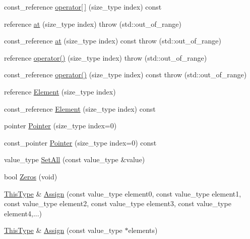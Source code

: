 \begin{DoxyCompactItemize}
\item 
const\+\_\+reference \hyperlink{classvct_fixed_size_vector_base_aab4c42f30b4481af7073b7993038389a}{operator\mbox{[}$\,$\mbox{]}} (size\+\_\+type index) const 
\item 
reference \hyperlink{classvct_fixed_size_vector_base_a787ffed04af0ebdde525c08e2da704da}{at} (size\+\_\+type index)  throw (std\+::out\+\_\+of\+\_\+range)
\item 
const\+\_\+reference \hyperlink{classvct_fixed_size_vector_base_a0425241e2ca18a9e3554cf9d58737cc3}{at} (size\+\_\+type index) const   throw (std\+::out\+\_\+of\+\_\+range)
\item 
reference \hyperlink{classvct_fixed_size_vector_base_a768864b05bd40054ca17a3ed0027ea54}{operator()} (size\+\_\+type index)  throw (std\+::out\+\_\+of\+\_\+range)
\item 
const\+\_\+reference \hyperlink{classvct_fixed_size_vector_base_a3d3ccc563d1d76820801178d2907f151}{operator()} (size\+\_\+type index) const   throw (std\+::out\+\_\+of\+\_\+range)
\item 
reference \hyperlink{classvct_fixed_size_vector_base_a571a7569f74a7dc6c25dc29794cfbe23}{Element} (size\+\_\+type index)
\item 
const\+\_\+reference \hyperlink{classvct_fixed_size_vector_base_a0b851f0bbe19cf157082e8abb819a558}{Element} (size\+\_\+type index) const 
\item 
pointer \hyperlink{classvct_fixed_size_vector_base_aa71ce242a6bb5be99f1ee03734a0ea79}{Pointer} (size\+\_\+type index=0)
\item 
const\+\_\+pointer \hyperlink{classvct_fixed_size_vector_base_aff11b9ec1fc5c53e04d3cb4c416c3b66}{Pointer} (size\+\_\+type index=0) const 
\item 
value\+\_\+type \hyperlink{classvct_fixed_size_vector_base_ae0659dd664fd0be5b5c4ff9c2d13c64e}{Set\+All} (const value\+\_\+type \&value)
\item 
bool \hyperlink{classvct_fixed_size_vector_base_ae05c0457787820f7bc312da5444a14d9}{Zeros} (void)
\item 
\hyperlink{classvct_fixed_size_const_vector_base_a071063bc4fa43112cc287b2dbef53180}{This\+Type} \& \hyperlink{classvct_fixed_size_vector_base_ac22e9269ac2c76822cf4889053063f66}{Assign} (const value\+\_\+type element0, const value\+\_\+type element1, const value\+\_\+type element2, const value\+\_\+type element3, const value\+\_\+type element4,...)
\item 
\hyperlink{classvct_fixed_size_const_vector_base_a071063bc4fa43112cc287b2dbef53180}{This\+Type} \& \hyperlink{classvct_fixed_size_vector_base_a38d50afd2b6bc08c82a9aac3ecba8a3d}{Assign} (const value\+\_\+type $\ast$elements)

\end{DoxyCompactItemize}
